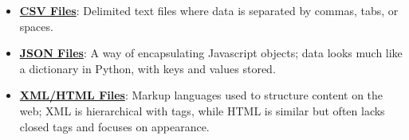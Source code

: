 \documentclass{article}%
\begin{document}
\begin{itemize}[leftmargin=*]
\item \href{https://purdue.brightspace.com/d2l/common/assets/pdfjs-d2l-dist/1.0.14-legacy/web/viewer.html?file=\%2Fcontent\%2Fenforced\%2F1095465-WL.202510.CS24200.LE1\%2F04L1-data.pdf\%3Fou\%3D1095465\&lang=en-us\&container=d2l-fileviewer-rendered-pdf\&fullscreen=d2l-fileviewer-rendered-pdf-dialog\&height=667#page=12}{\textbf{CSV Files}}: Delimited text files where data is separated by commas, tabs, or spaces.%
\item \href{https://purdue.brightspace.com/d2l/common/assets/pdfjs-d2l-dist/1.0.14-legacy/web/viewer.html?file=\%2Fcontent\%2Fenforced\%2F1095465-WL.202510.CS24200.LE1\%2F04L1-data.pdf\%3Fou\%3D1095465\&lang=en-us\&container=d2l-fileviewer-rendered-pdf\&fullscreen=d2l-fileviewer-rendered-pdf-dialog\&height=667#page=13}{\textbf{JSON Files}}: A way of encapsulating Javascript objects; data looks much like a dictionary in Python, with keys and values stored.%
\item \href{https://purdue.brightspace.com/d2l/common/assets/pdfjs-d2l-dist/1.0.14-legacy/web/viewer.html?file=\%2Fcontent\%2Fenforced\%2F1095465-WL.202510.CS24200.LE1\%2F04L1-data.pdf\%3Fou\%3D1095465\&lang=en-us\&container=d2l-fileviewer-rendered-pdf\&fullscreen=d2l-fileviewer-rendered-pdf-dialog\&height=667#page=14}{\textbf{XML/HTML Files}}: Markup languages used to structure content on the web; XML is hierarchical with tags, while HTML is similar but often lacks closed tags and focuses on appearance.%
\end{itemize}%
\end{document}
